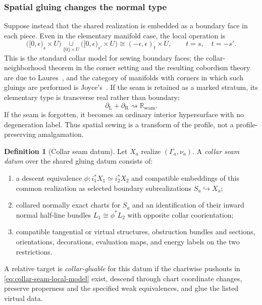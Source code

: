 \documentclass[11pt,letterpaper,twoside]{article}
\theoremstyle{plain}
\theoremstyle{definition}
\newtheorem{definition}[theorem]{Definition}
\theoremstyle{remark}
\let\cite\citep
\begin{document}
\subsubsection{Spatial gluing changes the normal type}

Suppose instead that the shared realization is embedded as a boundary face in each piece.  Even in the elementary manifold case, the local operation is
\begin{equation}\label{eq:collar-seam-local-model}
 \bigl([0,\epsilon)_s\times U\bigr)
 \underset{\{0\}\times U}{\cup}
 \bigl([0,\epsilon)_{s'}\times U\bigr)
 \cong
 (-\epsilon,\epsilon)_t\times U,
 \qquad
 t=s,\quad t=-s'.
\end{equation}
This is the standard collar model for sewing boundary faces; the collar-neighborhood theorem in the corner setting and the resulting cobordism theory are due to Laures~\cite{laures2000}, and the category of manifolds with corners in which such gluings are performed is Joyce's~\cite{joyce2009corners}.  If the seam is retained as a marked stratum, its elementary type is transverse real rather than boundary:
\begin{equation}\label{eq:seam-profile-transform}
 \partial_{\mathrm L}+\partial_{\mathrm R}
 \rightsquigarrow
 \mathbb R_{\mathrm{seam}}.
\end{equation}
If the seam is forgotten, it becomes an ordinary interior hypersurface with no degeneration label.  Thus spatial sewing is a transform of the profile, not a profile-preserving amalgamation.

\begin{definition}[Collar seam datum]\label{def:collar-seam-datum}
Let $X_a$ realize $(\Gamma_a,\nu_a)$.  A \emph{collar seam datum} over the shared gluing datum consists of:
\begin{enumerate}
\item a descent equivalence $\phi:i_1^*X_1\simeq i_2^*X_2$ and compatible embeddings of this common realization as selected boundary subrealizations $S_a\hookrightarrow X_a$;
\item collared normally exact charts for $S_a$ and an identification of their inward normal half-line bundles $L_1\cong\phi^*L_2$ with opposite collar coorientation;
\item compatible tangential or virtual structures, obstruction bundles and sections, orientations, decorations, evaluation maps, and energy labels on the two restrictions.
\end{enumerate}
A relative target is \emph{collar-gluable} for this datum if the chartwise pushouts in \eqref{eq:collar-seam-local-model} exist, descend through chart coordinate changes, preserve properness and the specified weak equivalences, and glue the listed virtual data.
\end{definition}
\end{document}
